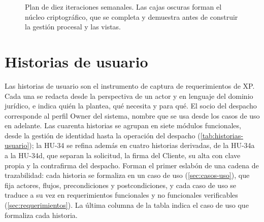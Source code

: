 \begin{figure}[H]
  \centering
  
  \caption{Plan de diez iteraciones semanales. Las cajas oscuras forman el núcleo criptográfico, que se completa y demuestra antes de construir la gestión procesal y las vistas.}
  \label{fig:03a-iteraciones}
\end{figure}

\section{Historias de usuario}\label{sec:historias-usuario}

Las historias de usuario son el instrumento de captura de requerimientos de XP. Cada una se redacta desde la perspectiva de un actor y en lenguaje del dominio jurídico, e indica quién la plantea, qué necesita y para qué. El socio del despacho corresponde al perfil Owner del sistema, nombre que se usa desde los casos de uso en adelante. Las cuarenta historias se agrupan en siete módulos funcionales, desde la gestión de identidad hasta la operación del despacho (\cref{tab:historias-usuario}); la HU-34 se refina además en cuatro historias derivadas, de la HU-34a a la HU-34d, que separan la solicitud, la firma del Cliente, su alta con clave propia y la contrafirma del despacho. Forman el primer eslabón de una cadena de trazabilidad: cada historia se formaliza en un caso de uso (\cref{sec:casos-uso}), que fija actores, flujos, precondiciones y postcondiciones, y cada caso de uso se traduce a su vez en requerimientos funcionales y no funcionales verificables (\cref{sec:requerimientos}). La última columna de la tabla indica el caso de uso que formaliza cada historia.

